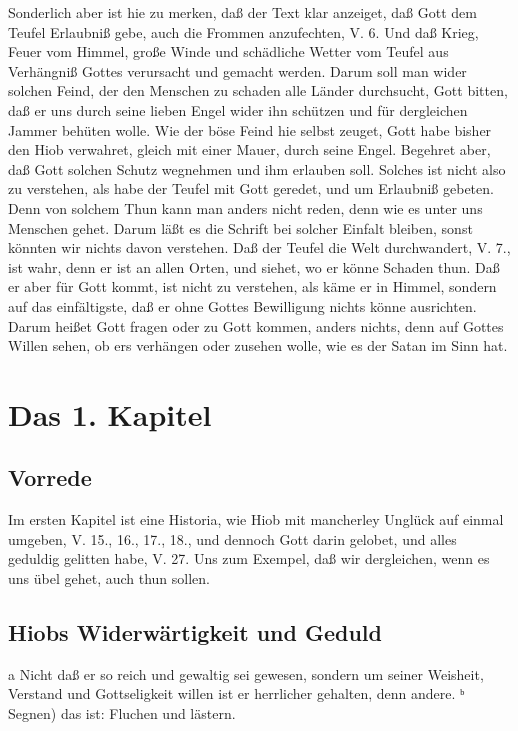 Sonderlich aber ist hie zu merken, daß der Text klar anzeiget, daß Gott dem Teufel Erlaubniß gebe, auch die Frommen anzufechten, V. 6. Und daß Krieg, Feuer vom Himmel, große Winde und schädliche Wetter vom Teufel aus Verhängniß Gottes verursacht und gemacht werden. Darum soll man wider solchen Feind, der den Menschen zu schaden alle Länder durchsucht, Gott bitten, daß er uns durch seine lieben Engel wider ihn schützen und für dergleichen Jammer behüten wolle. Wie der böse Feind hie selbst zeuget, Gott habe bisher den Hiob verwahret, gleich mit einer Mauer, durch seine Engel. Begehret aber, daß Gott solchen Schutz wegnehmen und ihm erlauben soll. Solches ist nicht also zu verstehen, als habe der Teufel mit Gott geredet, und um Erlaubniß gebeten. Denn von solchem Thun kann man anders nicht reden, denn wie es unter uns Menschen gehet. Darum läßt es die Schrift bei solcher Einfalt bleiben, sonst könnten wir nichts davon verstehen. Daß der Teufel die Welt durchwandert, V. 7., ist wahr, denn er ist an allen Orten, und siehet, wo er könne Schaden thun. Daß er aber für Gott kommt, ist nicht zu verstehen, als käme er in Himmel, sondern auf das einfältigste, daß er ohne Gottes Bewilligung nichts könne ausrichten. Darum heißet Gott fragen oder zu Gott kommen, anders nichts, denn auf Gottes Willen sehen, ob ers verhängen oder zusehen wolle, wie es der Satan im Sinn hat.

\chapter{Das 1. Kapitel}

\section{Vorrede}

Im ersten Kapitel ist eine Historia, wie Hiob mit mancherley Unglück auf einmal umgeben, V. 15., 16., 17., 18., und dennoch Gott darin gelobet, und alles geduldig gelitten habe, V. 27. Uns zum Exempel, daß wir dergleichen, wenn es uns übel gehet, auch thun sollen.

\section{Hiobs Widerwärtigkeit und Geduld}

a Nicht daß er so reich und gewaltig sei gewesen, sondern um seiner Weisheit, Verstand und Gottseligkeit willen ist er herrlicher gehalten, denn andere.
ᵇ Segnen) das ist: Fluchen und lästern.

